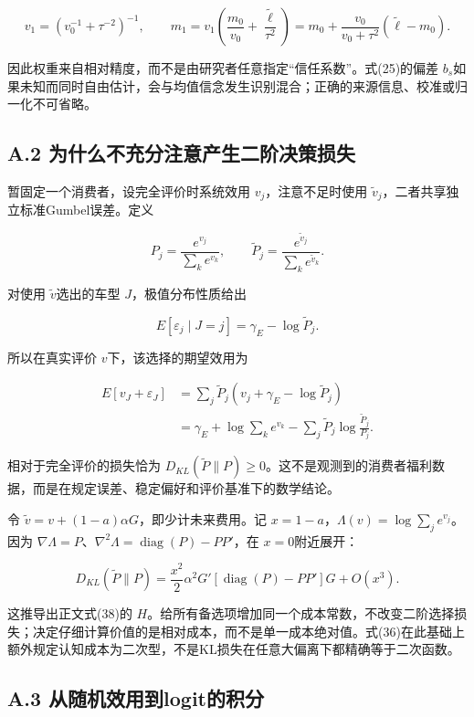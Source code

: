 \documentclass[
  11pt,
]{article}
\begin{document}
\[
v_1=(v_0^{-1}+\tau^{-2})^{-1},\qquad
m_1=v_1\left(\frac{m_0}{v_0}+\frac{\widetilde\ell}{\tau^2}\right)
=m_0+\frac{v_0}{v_0+\tau^2}(\widetilde\ell-m_0).
\tag{A2}
\]

因此权重来自相对精度，而不是由研究者任意指定``信任系数''。式(25)的偏差
\(b_s\)如果未知而同时自由估计，会与均值信念发生识别混合；正确的来源信息、校准或归一化不可省略。

\subsection{A.2
为什么不充分注意产生二阶决策损失}\label{a.2-ux4e3aux4ec0ux4e48ux4e0dux5145ux5206ux6ce8ux610fux4ea7ux751fux4e8cux9636ux51b3ux7b56ux635fux5931}

暂固定一个消费者，设完全评价时系统效用 \(v_j\)，注意不足时使用
\(\widetilde v_j\)，二者共享独立标准Gumbel误差。定义

\[
P_j=\frac{e^{v_j}}{\sum_ke^{v_k}},\qquad
\widetilde P_j=\frac{e^{\widetilde v_j}}{\sum_ke^{\widetilde v_k}}.
\tag{A3}
\]

对使用 \(\widetilde v\)选出的车型 \(J\)，极值分布性质给出

\[
E[\varepsilon_j\mid J=j]=\gamma_E-\log\widetilde P_j.
\tag{A4}
\]

所以在真实评价 \(v\)下，该选择的期望效用为

\[
\begin{aligned}
E[v_J+\varepsilon_J]
&=\sum_j\widetilde P_j(v_j+\gamma_E-\log\widetilde P_j)\\
&=\gamma_E+\log\sum_ke^{v_k}
-\sum_j\widetilde P_j\log\frac{\widetilde P_j}{P_j}.
\end{aligned}\tag{A5}
\]

相对于完全评价的损失恰为
\(D_{KL}(\widetilde P\|P)\geq0\)。这不是观测到的消费者福利数据，而是在规定误差、稳定偏好和评价基准下的数学结论。

令 \(\widetilde v=v+(1-a)\alpha G\)，即少计未来费用。记
\(x=1-a\)，\(\Lambda(v)=\log\sum_j e^{v_j}\)。因为
\(\nabla\Lambda=P\)、\(\nabla^2\Lambda=\operatorname{diag}(P)-PP'\)，在
\(x=0\)附近展开：

\[
D_{KL}(\widetilde P\|P)
=\frac{x^2}{2}\alpha^2G'[\operatorname{diag}(P)-PP']G+O(x^3).
\tag{A6}
\]

这推导出正文式(38)的
\(H\)。给所有备选项增加同一个成本常数，不改变二阶选择损失；决定仔细计算价值的是相对成本，而不是单一成本绝对值。式(36)在此基础上额外规定认知成本为二次型，不是KL损失在任意大偏离下都精确等于二次函数。

\subsection{A.3
从随机效用到logit的积分}\label{a.3-ux4eceux968fux673aux6548ux7528ux5230logitux7684ux79efux5206}
\end{document}
